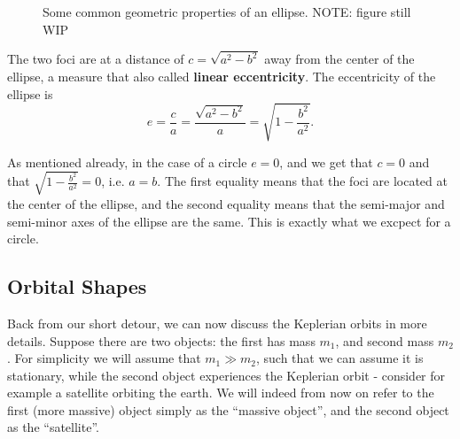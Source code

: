 \begin{figure}
  \begin{center}
  \end{center}
  \caption{Some common geometric properties of an ellipse. NOTE: figure still WIP}
  \label{fig:ellipse_geometerically}
\end{figure}

The two foci are at a distance of $c=\sqrt{a^{2}-b^{2}}$ away from the center of the ellipse, a measure that also called \textbf{linear eccentricity}. The eccentricity of the ellipse is
\begin{equation}
  e = \frac{c}{a} = \frac{\sqrt{a^{2}-b^{2}}}{a} = \sqrt{1-\frac{b^{2}}{a^{2}}}.
  \label{eq:label}
\end{equation}

As mentioned already, in the case of a circle $e=0$, and we get that $c=0$ and that $\sqrt{1-\frac{b^{2}}{a^{2}}}=0$, i.e. $a=b$. The first equality means that the foci are located at the center of the ellipse, and the second equality means that the semi-major and semi-minor axes of the ellipse are the same. This is exactly what we excpect for a circle.


\subsection{Orbital Shapes}
Back from our short detour, we can now discuss the Keplerian orbits in more details. Suppose there are two objects: the first has mass $m_{1}$, and second mass $m_{2}$. For simplicity we will assume that $m_{1}\gg m_{2}$, such that we can assume it is stationary, while the second object experiences the Keplerian orbit - consider for example a satellite orbiting the earth. We will indeed from now on refer to the first (more massive) object simply as the \enquote{massive object}, and the second object as the \enquote{satellite}.


